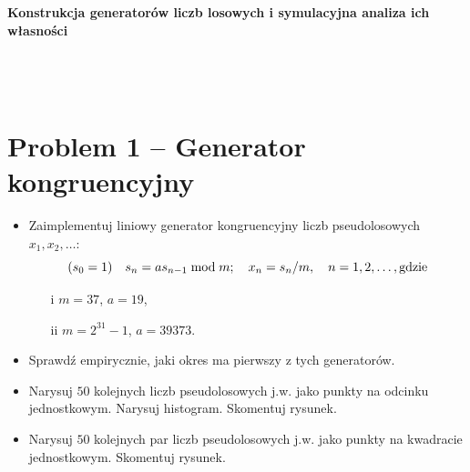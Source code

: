 \documentclass[12pt, a4paper]{article}\usepackage[]{graphicx}\usepackage[]{xcolor}
\author{Stanisław Olek}
\makeatletter
\renewcommand{\maketitle}{
    \begin{center}
        \vspace{5pt}
        \textbf{\Huge \sffamily Konstrukcja generatorów liczb losowych i symulacyjna analiza ich własności}\\
        \vspace{15pt}
        \textbf{\Large \sffamily \@title}\\
        \vspace{10pt}
        {\Large \sffamily \@author}\\
        \vspace{10pt}
        \hrulefill\\
        \vspace{20pt}
    \end{center}
}
\makeatother
\begin{document}


\maketitle

\tableofcontents
\thispagestyle{plain}

\newpage
\section{Problem 1 -- Generator kongruencyjny}
\begin{itemize}
\item Zaimplementuj liniowy generator kongruencyjny liczb pseudolosowych $x_1, x_2,\ldots$:
$$(s_0=1)\quad s_n=as_{n-1}\; {\rm mod} \; m;\quad x_n=s_n/m,\quad n=1,2,\ldots, \mbox{gdzie}$$
\begin{enumerate}
\item[i] $m=37$, $a=19$,
\item[ii] $m=2^{31}-1$, $a=39373$.
\end{enumerate} 
\item Sprawdź empirycznie, jaki okres ma pierwszy z tych generatorów.
\item Narysuj $50$ kolejnych liczb pseudolosowych j.w. jako punkty na odcinku jednostkowym. Narysuj histogram. Skomentuj rysunek.
\item Narysuj $50$ kolejnych par liczb pseudolosowych j.w. jako punkty na kwadracie jednostkowym. Skomentuj rysunek.
\end{itemize}

\medskip

\vspace{15pt}
\end{document}
